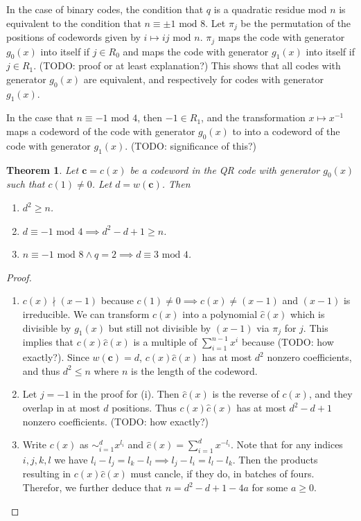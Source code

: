 \documentclass{article}
\renewcommand{\mod}{\text{ mod }}
\newcommand{\mt}{\mapsto}
\renewcommand{\=}{\equiv}
\renewcommand{\i}{^{-1}}
\renewcommand{\v}{\mathbf}
\theoremstyle{plain}
\newtheorem{thm}{Theorem}[subsection]
\theoremstyle{definition}
\newcommand{\TODO}[1]{(TODO: #1)}
\begin{document}
In the case of binary codes, the condition that $q$ is a quadratic residue mod $n$ is equivalent to the condition that $n \= \pm 1 \mod 8$.
Let $\pi_{j}$ be the permutation of the positions of codewords given by $i \mt ij \mod n$.
$\pi_j$ maps the code with generator $g_0(x)$ into itself if $j \in R_0$ and maps the code with generator $g_1(x)$ into itself if $j \in R_1$.
\TODO{proof or at least explanation?}
This shows that all codes with generator $g_0(x)$ are equivalent, and respectively for codes with generator $g_1(x)$.

In the case that $n \= -1 \mod 4$, then $-1 \in R_1$, and the transformation $x \mt x\i$ maps a codeword of the code with generator $g_0(x)$ to into a codeword of the code with generator $g_1(x)$.
\TODO{significance of this?}

\begin{thm}
  Let $\v c = c(x)$ be a codeword in the QR code with generator $g_0(x)$ such that $c(1) \neq 0$.
  Let $d = w(\v c)$.
  Then
  \begin{enumerate}
    \item[(i)] $d^2 \geq n$.
    \item[(ii)] $d \= -1 \mod 4 \implies d^2 - d + 1 \geq n$.
    \item[(iii)] $n \= -1 \mod 8 \land q = 2 \implies d \= 3 \mod 4$.
  \end{enumerate}
\end{thm}

\begin{proof}
\hspace{0em}
\begin{enumerate}
  \item[(i)]
  $c(x) \nmid (x-1)$ because $c(1) \neq 0 \implies c(x) \neq (x-1)$ and $(x-1)$ is irreducible.
  We can transform $c(x)$ into a polynomial $\hat c(x)$ which is divisible by $g_1(x)$ but still not divisible by $(x-1)$
  via $\pi_j$ for $j$.
  This implies that $c(x) \hat c(x)$ is a multiple of $\sum_{i=1}^{n-1} x^i$ because \TODO{how exactly?}.
  Since $w(\v c) = d$, $c(x) \hat c(x)$ has at most $d^2$ nonzero coefficients, and thus $d^2 \leq n$ where $n$ is the length of the codeword.

  \item[(ii)]
  Let $j = -1$ in the proof for (i). Then $\hat c(x)$ is the reverse of $c(x)$, and they overlap in at most $d$ positions.
  Thus $c(x) \hat c(x)$ has at most $d^2 - d + 1$ nonzero coefficients. \TODO{how exactly?}

  \item[(iii)]
  Write $c(x)$ as $\sim_{i=1}^d x^{l_i}$ and $\hat c(x) = \sum_{i=1}^d x^{-l_i}$.
  Note that for any indices $i,j,k,l$ we have $l_i - l_j = l_k - l_l \implies l_j - l_i = l_l - l_k$.
  Then the products resulting in $c(x) \hat c(x)$ must cancle, if they do, in batches of fours.
  Therefor, we further deduce that $n = d^2 - d + 1 - 4a$ for some $a \geq 0$.
\end{enumerate}
\end{proof}
\end{document}
